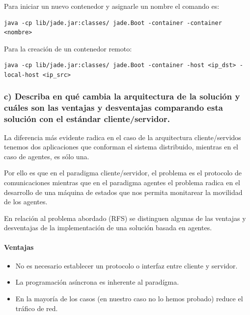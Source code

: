 \documentclass[11pt]{extarticle}
\begin{document}
Para iniciar un nuevo contenedor y asignarle un nombre el comando es:

\begin{verbatim}
java -cp lib/jade.jar:classes/ jade.Boot -container -container <nombre>
\end{verbatim}

Para la creación de un contenedor remoto:

\begin{verbatim}
java -cp lib/jade.jar:classes/ jade.Boot -container -host <ip_dst> -local-host <ip_src>
\end{verbatim}

    \hypertarget{c-describa-en-quuxe9-cambia-la-arquitectura-de-la-soluciuxf3n-y-cuuxe1les-son-las-ventajas-y-desventajas-comparando-esta-soluciuxf3n-con-el-estuxe1ndar-clienteservidor.}{%
\subsubsection{c) Describa en qué cambia la arquitectura de la solución
y cuáles son las ventajas y desventajas comparando esta solución con el
estándar
cliente/servidor.}\label{c-describa-en-quuxe9-cambia-la-arquitectura-de-la-soluciuxf3n-y-cuuxe1les-son-las-ventajas-y-desventajas-comparando-esta-soluciuxf3n-con-el-estuxe1ndar-clienteservidor.}}

    La diferencia más evidente radica en el caso de la arquitectura
cliente/servidos tenemos dos aplicaciones que conforman el sistema
distribuido, mientras en el caso de agentes, es sólo una.

Por ello es que en el paradigma cliente/servidor, el problema es el
protocolo de comunicaciones mientras que en el paradigma agentes el
problema radica en el desarrollo de una máquina de estados que nos
permita monitarear la movilidad de los agentes.

En relación al problema abordado (RFS) se distinguen algunas de las
ventajas y desventajas de la implementación de una solución basada en
agentes.

\hypertarget{ventajas}{%
\paragraph{Ventajas}\label{ventajas}}

\begin{itemize}
\item
  No es necesario establecer un protocolo o interfaz entre cliente y
  servidor.
\item
  La programación asíncrona es inherente al paradígma.
\item
  En la mayoría de los casos (en nuestro caso no lo hemos probado)
  reduce el tráfico de red.
\end{itemize}
\end{document}
